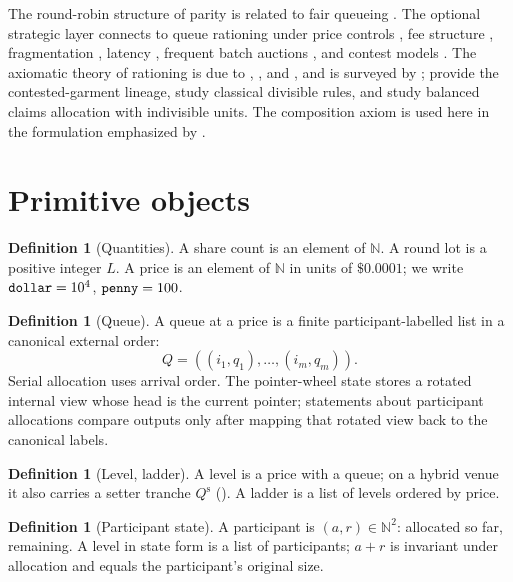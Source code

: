 \documentclass[11pt]{article}
\theoremstyle{definition}
\newtheorem{definition}[theorem]{Definition}
\theoremstyle{remark}
\newcommand{\codeunderscore}{\char`\_\allowbreak}
\newcommand{\lean}[1]{\ifmmode\mathtt{#1}\else{\ttfamily\let\_\codeunderscore #1}\fi}
\newcommand{\N}{\mathbb{N}}
\begin{document}
The round-robin structure of parity is related to fair queueing \citep{nagle1987fair}. The optional strategic layer connects to queue rationing under price controls \citep{yao2018tick}, fee structure \citep{comerton2019inverted}, fragmentation \citep{ohara2011fragmentation}, latency \citep{ding2014slow,bartlett2019latency}, frequent batch auctions \citep{budish2015hft}, and contest models \citep{tullock1980,baye1996allpay}. The axiomatic theory of rationing is due to \citet{young1987}, \citet{young1994}, and \citet{moulin2000}, and is surveyed by \citet{thomson2003}; \citet{aumann1985} provide the contested-garment lineage, \citet{herrero2001} study classical divisible rules, and \citet{herrero2008} study balanced claims allocation with indivisible units. The composition axiom is used here in the formulation emphasized by \citet{moulin2000}.

\section{Primitive objects}\label{sec:objects}

\begin{definition}[Quantities]
A share count is an element of $\N$. A round lot is a positive integer $L$. A price is an element of $\N$ in units of $\$0.0001$; we write $\lean{dollar}=10^4$, $\lean{penny}=100$.
\end{definition}

\begin{definition}[Queue]
A queue at a price is a finite participant-labelled list in a canonical external order:
\[
Q=((i_1,q_1),\dots,(i_m,q_m)).
\]
Serial allocation uses arrival order. The pointer-wheel state stores a rotated internal view whose head is the current pointer; statements about participant allocations compare outputs only after mapping that rotated view back to the canonical labels.
\end{definition}

\begin{definition}[Level, ladder]
A level is a price with a queue; on a hybrid venue it also carries a setter tranche $Q^{\mathrm s}$ (\lean{Level}). A ladder is a list of levels ordered by price.
\end{definition}

\begin{definition}[Participant state]
A participant is $(a,r)\in\N^2$: allocated so far, remaining. A level in state form is a list of participants; $a+r$ is invariant under allocation and equals the participant's original size.
\end{definition}
\end{document}
